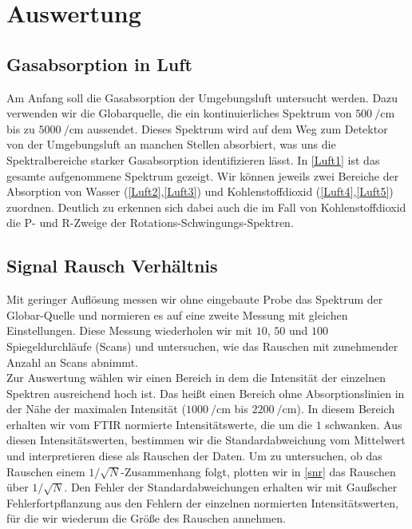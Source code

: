 \documentclass[paper=a4,fontsize=10pt,DIV=18,twocolumn,parskip=half]{scrartcl}
\numberwithin{equation}{section}    %
\begin{document}

\section{Auswertung}

\subsection{Gasabsorption in Luft}
Am Anfang soll die Gasabsorption der Umgebungsluft untersucht werden.  Dazu 
verwenden wir die Globarquelle, die ein kontinuierliches Spektrum von 
$\SI{500}{\per\centi\meter}$ bis zu $\SI{5000}{\per\centi\meter}$ aussendet.  
Dieses Spektrum wird auf dem Weg zum Detektor von der Umgebungsluft an manchen 
Stellen absorbiert, was uns die Spektralbereiche starker Gasabsorption 
identifizieren lässt.
In \ref{Luft1} ist das gesamte aufgenommene Spektrum gezeigt.  Wir können 
jeweils zwei Bereiche der Absorption von Wasser (\ref{Luft2},\ref{Luft3}) und 
Kohlenstoffdioxid (\ref{Luft4},\ref{Luft5}) zuordnen.  Deutlich zu erkennen sich 
dabei auch die im Fall von Kohlenstoffdioxid die P- und R-Zweige der 
Rotations-Schwingungs-Spektren.

\subsection{Signal Rausch Verhältnis}
Mit geringer Auflösung messen wir ohne eingebaute Probe das Spektrum der 
Globar-Quelle und normieren es auf eine zweite Messung mit gleichen 
Einstellungen. Diese Messung wiederholen wir mit $10$, $50$ und $100$ 
Spiegeldurchläufe (Scans) und untersuchen, wie das Rauschen mit zunehmender 
Anzahl an Scans abnimmt.\\
Zur Auswertung wählen wir einen Bereich in dem die Intensität der einzelnen 
Spektren ausreichend hoch ist. Das heißt einen Bereich ohne Absorptionslinien in 
der Nähe der maximalen Intensität ($\SI{1000}{\per\centi\meter}$ bis 
$\SI{2200}{\per\centi\meter}$). In diesem Bereich erhalten wir vom FTIR 
normierte Intensitätswerte, die um die $1$ schwanken. Aus diesen 
Intensitätswerten, bestimmen wir die Standardabweichung vom Mittelwert und 
interpretieren diese als Rauschen der Daten. Um zu untersuchen, ob das Rauschen 
einem $1/\sqrt{N}$-Zusammenhang folgt, plotten wir in \ref{snr} das Rauschen 
über $1/\sqrt{N}$. Den Fehler der Standardabweichungen erhalten wir mit 
Gaußscher Fehlerfortpflanzung aus den Fehlern der einzelnen normierten 
Intensitätswerten, für die wir wiederum die Größe des Rauschen annehmen.
\end{document}
